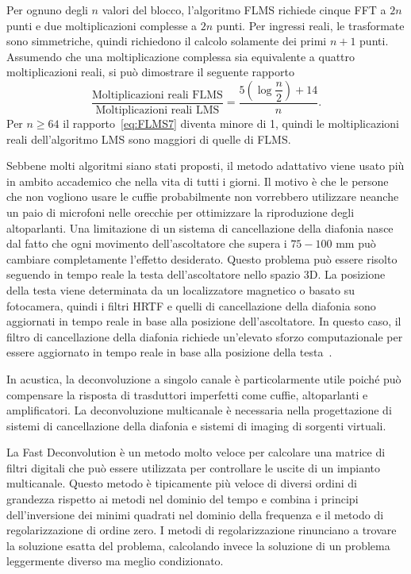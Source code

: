 \documentclass[12pt,a4paper,titlepage]{article}
\begin{document}
Per ognuno degli $n$ valori del blocco, l'algoritmo FLMS richiede cinque FFT a $2n$ punti e due moltiplicazioni complesse a $2n$ punti. Per ingressi reali, le trasformate sono simmetriche, quindi richiedono il calcolo solamente dei primi $n+1$ punti. Assumendo che una moltiplicazione complessa sia equivalente a quattro moltiplicazioni reali, si può dimostrare il seguente rapporto
\begin{equation}\label{eq:FLMS7}
\dfrac{\text{Moltiplicazioni reali FLMS}}{\text{Moltiplicazioni reali LMS}} = \dfrac{5\left(\log\dfrac{n}{2}\right)+14}{n}.
\end{equation}
Per $n \geq 64$ il rapporto~\eqref{eq:FLMS7} diventa minore di 1, quindi le moltiplicazioni reali dell'algoritmo LMS sono maggiori di quelle di FLMS.

Sebbene molti algoritmi siano stati proposti, il metodo adattativo viene usato più in ambito accademico che nella vita di tutti i giorni. Il motivo è che le persone che non vogliono usare le cuffie probabilmente non vorrebbero utilizzare neanche un paio di microfoni nelle orecchie per ottimizzare la riproduzione degli altoparlanti. Una limitazione di un sistema di cancellazione della diafonia nasce dal fatto che ogni movimento dell'ascoltatore che supera i $75-100$ \si{\milli \meter} può cambiare completamente l'effetto desiderato. Questo problema può essere risolto seguendo in tempo reale la testa dell'ascoltatore nello spazio 3D. La posizione della testa viene determinata da un localizzatore magnetico o basato su fotocamera, quindi i filtri HRTF e quelli di cancellazione della diafonia sono aggiornati in tempo reale in base alla posizione dell'ascoltatore. In questo caso, il filtro di cancellazione della diafonia richiede un'elevato sforzo computazionale per essere aggiornato in tempo reale in base alla posizione della testa~\cite{wand:a_stereo_crosstalk}. 

In acustica, la deconvoluzione a singolo canale è particolarmente utile poiché può compensare la risposta di trasduttori imperfetti come cuffie, altoparlanti e amplificatori. La deconvoluzione multicanale è necessaria nella progettazione di sistemi di cancellazione della diafonia e sistemi di imaging di sorgenti virtuali.%

La Fast Deconvolution è un metodo molto veloce per calcolare una matrice di filtri digitali che può essere utilizzata per controllare le uscite di un impianto multicanale. Questo metodo è tipicamente più veloce di diversi ordini di grandezza rispetto ai metodi nel dominio del tempo e combina i principi dell'inversione dei minimi quadrati nel dominio della frequenza e il metodo di regolarizzazione di ordine zero. I metodi di regolarizzazione rinunciano a trovare la soluzione esatta del problema, calcolando invece la soluzione di un problema leggermente diverso ma meglio condizionato. %
\end{document}
